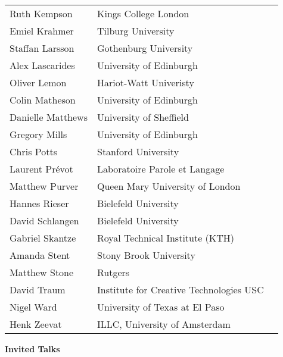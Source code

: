 \documentclass[a4paper,12pt,oneside]{book}
\begin{document}
\begin{longtable}{@{}p{}p{}p{}}
Ruth Kempson & Kings College London & \\
Emiel Krahmer & Tilburg University & \\
Staffan Larsson & Gothenburg University & \\
Alex Lascarides & University of Edinburgh & \\
Oliver Lemon & Hariot-Watt Univeristy & \\
Colin Matheson & University of Edinburgh & \\
Danielle Matthews & University of Sheffield & \\
Gregory Mills & University of Edinburgh & \\
Chris Potts & Stanford University & \\
Laurent Pr\'evot & Laboratoire Parole et Langage & \\
Matthew Purver & Queen Mary University of London & \\
Hannes Rieser & Bielefeld University & \\
David Schlangen & Bielefeld University & \\
Gabriel Skantze & Royal Technical Institute (KTH) & \\
Amanda Stent & Stony Brook University & \\
Matthew Stone & Rutgers & \\
David Traum & Institute for Creative Technologies USC & \\
Nigel Ward & University of Texas at El Paso & \\
Henk Zeevat & ILLC, University of Amsterdam & \\
\end{longtable}

\clearpage


\setlength{\parskip}{0pt}

\renewcommand{\contentsname}{\mbox{}\\[-108pt]\noindent\textbf{\Large
    Table of Contents}\\[-28pt]}
\tableofcontents
\cleardoublepage

\thispagestyle{empty}
\mbox{}\vfill
\begin{center}
\Huge \bf Invited Talks
\end{center}
\mbox{}\vfill
\end{document}
